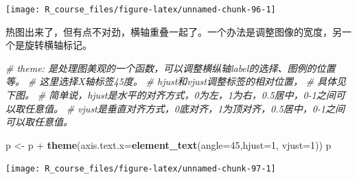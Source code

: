 \documentclass[]{article}
\newenvironment{Shaded}{\begin{snugshade}}{\end{snugshade}}
\newcommand{\KeywordTok}[1]{\textcolor[rgb]{0.13,0.29,0.53}{\textbf{{#1}}}}
\newcommand{\DataTypeTok}[1]{\textcolor[rgb]{0.13,0.29,0.53}{{#1}}}
\newcommand{\DecValTok}[1]{\textcolor[rgb]{0.00,0.00,0.81}{{#1}}}
\newcommand{\StringTok}[1]{\textcolor[rgb]{0.31,0.60,0.02}{{#1}}}
\newcommand{\CommentTok}[1]{\textcolor[rgb]{0.56,0.35,0.01}{\textit{{#1}}}}
\newcommand{\NormalTok}[1]{{#1}}
\numberwithin{figure}{section}
\numberwithin{table}{section}
\theoremstyle{definition}
\theoremstyle{definition}
\theoremstyle{definition}
\theoremstyle{remark}
\begin{document}
\begin{center}\texttt{[image: R\_course\_files/figure-latex/unnamed-chunk-96-1]} \end{center}

热图出来了，但有点不对劲，横轴重叠一起了。一个办法是调整图像的宽度，另一个是旋转横轴标记。

\begin{Shaded}
\begin{Highlighting}[]
\CommentTok{# theme: 是处理图美观的一个函数，可以调整横纵轴label的选择、图例的位置等。}
\CommentTok{# 这里选择X轴标签45度。}
\CommentTok{# hjust和vjust调整标签的相对位置，}
\CommentTok{# 具体见下图。}
\CommentTok{# 简单说，hjust是水平的对齐方式，0为左，1为右，0.5居中，0-1之间可以取任意值。}
\CommentTok{# vjust是垂直对齐方式，0底对齐，1为顶对齐，0.5居中，0-1之间可以取任意值。}

\NormalTok{p <-}\StringTok{ }\NormalTok{p +}\StringTok{ }\KeywordTok{theme}\NormalTok{(}\DataTypeTok{axis.text.x=}\KeywordTok{element_text}\NormalTok{(}\DataTypeTok{angle=}\DecValTok{45}\NormalTok{,}\DataTypeTok{hjust=}\DecValTok{1}\NormalTok{, }\DataTypeTok{vjust=}\DecValTok{1}\NormalTok{))}
\NormalTok{p}
\end{Highlighting}
\end{Shaded}

\begin{center}\texttt{[image: R\_course\_files/figure-latex/unnamed-chunk-97-1]} \end{center}
\end{document}
